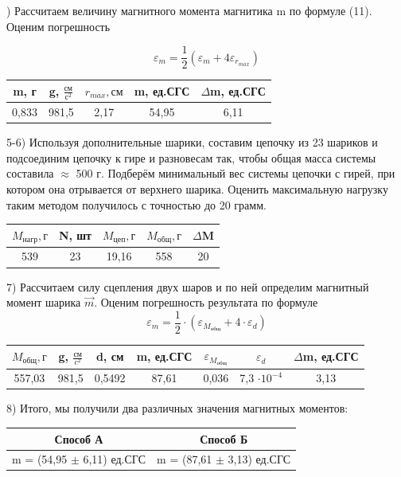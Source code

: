 \documentclass[a4paper,12pt]{article}
\begin{document}
) Рассчитаем величину магнитного момента магнитика m по формуле (11). Оценим погрешность 

$$ \varepsilon_m = \frac{1}{2}(\varepsilon_m + 4\varepsilon_{r_{max}})  $$

\begin{center}
\begin{tabular}{|c|c|c|c|c|}
	\hline
	m, г & g, $\frac{\text{см}}{с^2}$ & $r_{max}, см$ & m, ед.СГС & $\Delta$m, ед.СГС \\
	\hline
	0,833 & 981,5 & 2,17 & 54,95 & 6,11 \\
	\hline
\end{tabular}
\end{center}

5-6) Используя дополнительные шарики, составим цепочку из 23 шариков и подсоединим цепочку к гире и разновесам так, чтобы общая масса системы составила $\approx$ 500 г. Подберём минимальный вес системы цепочки с гирей, при котором она отрывается от верхнего шарика. Оценить максимальную нагрузку таким методом получилось с точностью до 20 грамм.  

\begin{center}
\begin{tabular}{|c|c|c|c|c|}
	\hline
	$M_{\text{нагр}}, г$ &  N, шт & $M_{\text{цеп}}, г$ & $M_{\text{общ}}, г$ & $\Delta$M \\
	\hline
	539 & 23 & 19,16 & 558 & 20 \\
	\hline
\end{tabular}
\end{center}

7) Рассчитаем силу сцепления двух шаров и по ней определим магнитный момент шарика $\vec{m}$. Оценим погрешность результата по формуле $$ \varepsilon_m = \frac{1}{2} \cdot (\varepsilon_{M_{общ}} + 4 \cdot \varepsilon_d) $$

\begin{center}
\begin{tabular}{|c|c|c|c|c|c|c|}
	\hline
	$M_{общ}, г$ & g, $\frac{\text{см}}{c^2}$ & d, см & m, ед.СГС & $\varepsilon_{M_{общ}}$ & $\varepsilon_d$ & $\Delta$m, ед.СГС \\
	\hline
	557,03 & 981,5 & 0,5492 & 87,61 & 0,036 & 7,3 $\cdot 10^{-4}$ & 3,13 \\
	\hline
\end{tabular}
\end{center}

8) Итого, мы получили два различных значения магнитных моментов: 
\begin{center}
\begin{tabular}{|c|c|}
	\hline
	Способ А & Способ Б \\
	\hline
	m = (54,95 $\pm$ 6,11) ед.СГС & m = (87,61 $\pm$ 3,13) ед.СГС \\
	\hline
\end{tabular}
\end{center}
\end{document}
